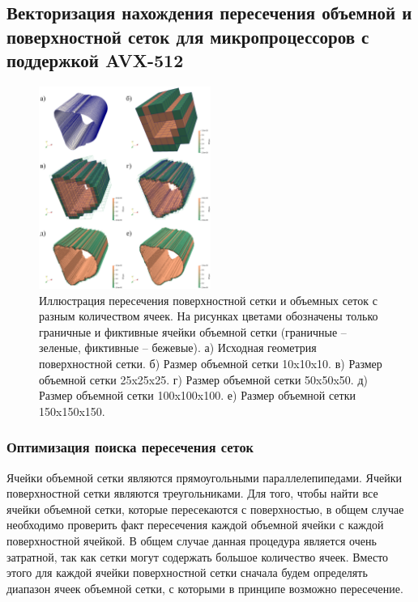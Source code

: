 \subsection{Векторизация нахождения пересечения объемной и поверхностной сеток для микропроцессоров с поддержкой AVX-512}

\begin{figure}[ht]
	\centering
		\includegraphics[width=0.5\textwidth]{./pics/text_4_mesh_intersect/contour.png}
	\caption{Иллюстрация пересечения поверхностной сетки и объемных сеток с разным количеством ячеек. На рисунках цветами обозначены только граничные и фиктивные ячейки объемной сетки (граничные -- зеленые, фиктивные -- бежевые). а) Исходная геометрия поверхностной сетки. б) Размер объемной сетки 10x10x10. в) Размер объемной сетки 25x25x25. г) Размер объемной сетки 50x50x50. д) Размер объемной сетки 100x100x100. е) Размер объемной сетки 150x150x150.}
	\label{fig:text_1_mesh_intersect_contour}
\end{figure}

\subsubsection{Оптимизация поиска пересечения сеток}

Ячейки объемной сетки являются прямоугольными параллелепипедами.
Ячейки поверхностной сетки являются треугольниками.
Для того, чтобы найти все ячейки объемной сетки, которые пересекаются с поверхностью, в общем случае необходимо проверить факт пересечения каждой объемной ячейки с каждой поверхностной ячейкой.
В общем случае данная процедура является очень затратной, так как сетки могут содержать большое количество ячеек.
Вместо этого для каждой ячейки поверхностной сетки сначала будем определять диапазон ячеек объемной сетки, с которыми в принципе возможно пересечение.

